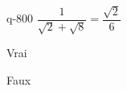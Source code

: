 \begin{truefalse}{q-800}
$\dfrac{1}{\sqrt{2}+\sqrt{8}} = \dfrac{\sqrt{2}}{6}$
\item* Vrai
\item Faux
\end{truefalse}

